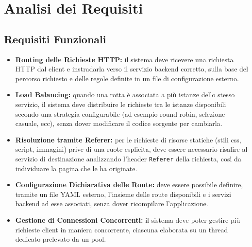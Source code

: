 \section{Analisi dei Requisiti}
\label{sec:requisiti}

\subsection{Requisiti Funzionali}
\begin{itemize}
    \item \textbf{Routing delle Richieste HTTP:} il sistema deve ricevere una richiesta HTTP dal client e instradarla verso il servizio backend corretto,
      sulla base del percorso richiesto e delle regole definite in un file di configurazione esterno.
    \item \textbf{Load Balancing:} quando una rotta è associata a più istanze dello stesso servizio, il sistema deve distribuire
      le richieste tra le istanze disponibili secondo una strategia configurabile (ad esempio round-robin, selezione casuale, ecc), senza dover modificare il codice sorgente per cambiarla.
    \item \textbf{Risoluzione tramite Referer:} per le richieste di risorse statiche (stili css, script, immagini) prive di una ruote esplicita,
      deve essere necessario risalire al servizio di destinazione analizzando l'header \texttt{Referer} della richiesta, così da individuare la pagina che le ha originate.
    \item \textbf{Configurazione Dichiarativa delle Route:} deve essere possibile definire, tramite un file YAML esterno,
      l'insieme delle route disponibili e i servizi backend ad esse associati, senza dover ricompilare l'applicazione.
    \item \textbf{Gestione di Connessioni Concorrenti:} il sistema deve poter gestire più richieste client in maniera concorrente, ciascuna elaborata su un thread dedicato prelevato da un pool.
\end{itemize}

